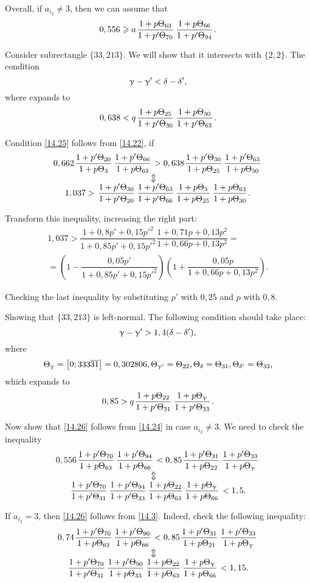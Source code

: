 Overall, if $a_{i_2} \ne 3$, then we can assume that
\begin{equation}\label{14.24}
	0,556 \geqslant a \up{63}{70} \up{66}{94}.
\end{equation}

Consider subrectangle $\{33, 213\}$.
We will show that it intersects with $\{2,2\}$.
The condition
\begin{equation*}
	\upgamma - \upgamma' < \delta - \delta',
\end{equation*}
where
expands to
\begin{equation}\label{14.25}
	0,638 < q \up{25}{30} \up{30}{63}.
\end{equation}

Condition \ref{14.25} follows from \ref{14.22}, if
\begin{gather*}
	0,662 \pu{20}{3} \pu{66}{63} > 0,638 \pu{30}{25} \pu{63}{30}\\
	\ArrowBetweenLines
	1,037 > \pp{30}{20} \pp{63}{66} \uu{3}{25} \uu{63}{30}.
\end{gather*}

Transform this inequality, increasing the right part:
\begin{multline*}
	1,037 >
	\dfrac{1 + 0,8p' + 0,15 p'^2}{1 + 0,85p' + 0,15 p'^2}
	\dfrac{1 + 0,71p + 0,13p^2}{1 + 0,66p + 0,13p^2} =\\
	=
	\left(
		1 - \dfrac{0,05p'}{1 + 0,85p' + 0,15p'^2}
	\right)
	\left(
		1 + \dfrac{0,05p}{1 + 0,66p + 0,13p^2}
	\right).
\end{multline*}

Checking the last inequality by substituting $p'$ with $0,25$ and $p$ with $0,8$.

Showing that $\{33, 213\}$ is left-normal.
The following condition should take place:
\begin{equation*}
	\upgamma - \upgamma' > 1,4(\delta - \delta'),
\end{equation*}
where
\begin{equation*}
	\Theta_{\upgamma} = \left[0; 333 \overline{31}\right] = 0,302806,
	\Theta_{\upgamma'} = \Theta_{22},
	\Theta_{\delta} = \Theta_{31},
	\Theta_{\delta'} = \Theta_{33},
\end{equation*}
which expands to
\begin{equation}\label{14.26}
	0,85 > q \up{22}{31} \up{\g}{33}.
\end{equation}

Now show that \ref{14.26} follows from \ref{14.24} in case $a_{i_2} \ne 3$.
We need to check the inequality
\begin{gather*}
	0,556 \pu{70}{63} \pu{94}{66} < 0,85 \pu{31}{22} \pu{33}{\g}\\
	\ArrowBetweenLines
	\pp{70}{31} \pp{94}{33} \uu{22}{63} \uu{\g}{66} < 1,5.
\end{gather*}

If $a_{i_2} = 3$, then \ref{14.26} follows from \ref{14.3}.
Indeed, check the following inequality:
\begin{gather*}
	0,74 \pu{70}{63} \pu{90}{66} < 0,85 \pu{31}{21} \pu{33}{\g}\\
	\ArrowBetweenLines
	\pp{70}{31} \pu{90}{33} \uu{22}{63} \uu{\g}{66} < 1,15.
\end{gather*}
